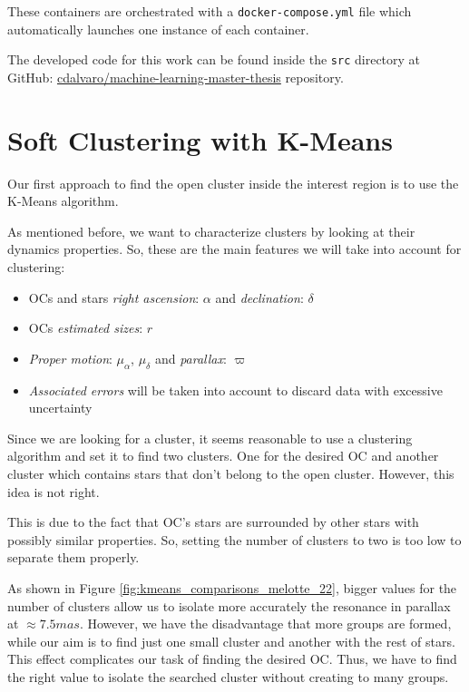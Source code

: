 \documentclass[11pt, a4paper, english]{book}
\begin{document}
These containers are orchestrated with a \verb|docker-compose.yml| file which automatically launches one instance of each container.

The developed code for this work can be found inside the \verb|src| directory at GitHub:
\href{https://github.com/cdalvaro/machine-learning-master-thesis}{cdalvaro/machine-learning-master-thesis} repository.

\section{Soft Clustering with K-Means}


Our first approach to find the open cluster inside the interest region is to use the K-Means algorithm.

As mentioned before, we want to characterize clusters by looking at their dynamics properties.
So, these are the main features we will take into account for clustering:

\begin{itemize}
  \item OCs and stars \emph{right ascension}: $\alpha$ and \emph{declination}: $\delta$
  \item OCs \emph{estimated sizes}: $r$
  \item \emph{Proper motion}: $\mu_{\alpha}$, $\mu_{\delta}$ and \emph{parallax}: $\varpi$
  \item \emph{Associated errors} will be taken into account to discard data with excessive uncertainty
\end{itemize}

Since we are looking for a cluster, it seems reasonable to use a clustering algorithm and set it to find two clusters.
One for the desired OC and another cluster which contains stars that don't belong to the open cluster.
However, this idea is not right.

This is due to the fact that OC's stars are surrounded by other stars with possibly similar properties. So, setting the number of clusters
to two is too low to separate them properly.

As shown in Figure \ref{fig:kmeans_comparisons_melotte_22}, bigger values for the number of clusters allow us to isolate more accurately
the resonance in parallax at $\approx 7.5mas$. However, we have the disadvantage that more groups are formed, while our aim is to find just
one small cluster and another with the rest of stars. This effect complicates our task of finding the desired OC. Thus, we have to find
the right value to isolate the searched cluster without creating to many groups.
\end{document}

